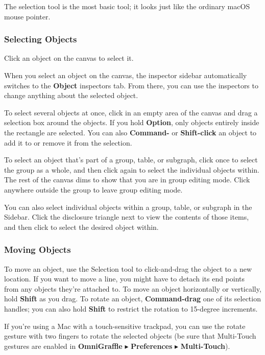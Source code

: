 \documentclass[../main.tex]{subfiles}
\begin{document}
The selection tool is the most basic tool; it looks just like the ordinary macOS mouse pointer.

\subsubsection{Selecting Objects}

Click an object on the canvas to select it.

When you select an object on the canvas, the inspector sidebar automatically switches to the
\textbf{Object} inspectors tab. From there, you can use the inspectors to change anything
about the selected object.

To select several objects at once, click in an empty area of the canvas and drag a selection box
around the objects. If you hold \textbf{Option}, only objects entirely inside the rectangle
are selected. You can also \textbf{Command-} or \textbf{Shift-click} an object to add it to or
remove it from the selection.

To select an object that's part of a group, table, or subgraph, click once to select the group
as a whole, and then click again to select the individual objects within. The rest of the
canvas dims to show that you are in group editing mode. Click anywhere outside the group to
leave group editing mode.

\begin{ognote}
  You can also select individual objects within a group, table, or subgraph in the Sidebar. Click
  the disclosure triangle next to view the contents of those items, and then click to select the
  desired object within.
\end{ognote}

\subsubsection{Moving Objects}

To move an object, use the Selection tool to click-and-drag the object to a new location. If you
want to move a line, you might have to detach its end points from any objects they're attached
to. To move an object horizontally or vertically, hold \textbf{Shift} as you drag. To rotate
an object, \textbf{Command-drag} one of its selection handles; you can also hold
\textbf{Shift} to restrict the rotation to 15-degree increments.

If you're using a Mac with a touch-sensitive trackpad, you can use the rotate gesture with two
fingers to rotate the selected objects (be sure that Multi-Touch gestures are enabled in
  \textbf{OmniGraffle} $\blacktriangleright$ \textbf{Preferences} $\blacktriangleright$
\textbf{Multi-Touch}).
\end{document}

